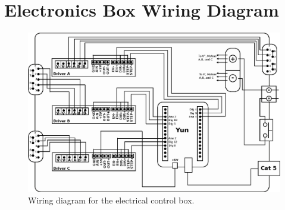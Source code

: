 \documentclass[11pt]{article}
\begin{document}
\section{Electronics Box Wiring Diagram}
\begin{figure}[h]
\begin{center}
\includegraphics[width = 5.5in]{wiringDrawingUpdate.eps}
\caption{Wiring diagram for the electrical control box.}  
\label{elecFit}
\end{center}
\end{figure}
\end{document}

